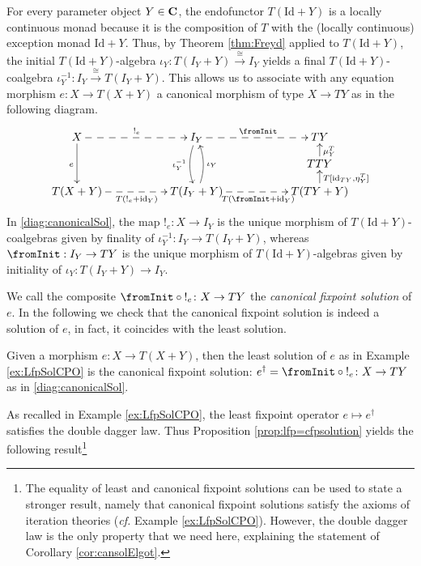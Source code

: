 \documentclass[oribibl,envcountsame,envcountsect,runningheads]{llncs}
\newcommand{\toFinal}[1]{{!_{#1}}}\DeclareMathSymbol{\fromInit}{\mathord}{operators}{"3C}
\renewcommand{\>}{\rangle}
\def\id{\mathrm{id}}
\def\Id{\mathrm{Id}}
\def\lsol#1{{#1}^\dag} \def\gensol#1{{#1}^\dag} \def\ssol#1{{#1}^{\star}} \def\cansol#1{{#1}^\dag}
\def\carrier{I}
\def\:{\colon}
\begin{document}
For every parameter object $Y \in \mathbf{C}$, the endofunctor $T(\Id +Y)$ is
a locally continuous monad because it is the composition of $T$ with the (locally continuous) exception monad $\Id +Y$. Thus, by Theorem \ref{thm:Freyd} applied to $T(\Id +Y)$, the initial $T(\Id +Y)$-algebra $\iota_Y : T(\carrier_Y + Y)\xrightarrow{\cong} \carrier_Y$ yields a final $T(\Id +Y)$-coalgebra $\iota_Y^{-1} : \carrier_Y \xrightarrow{\cong} T(\carrier_Y + Y)$. This allows us to associate with any equation morphism $e: X \to T(X+Y)$ a canonical morphism of type $X \to TY$ as in the following diagram.
\begin{equation}\label{diag:canonicalSol}
\vcenter{
    \xymatrix@R=10pt{
    X \ar@{-->}[rr]^{\toFinal{e}} \ar[dd]_{e} & & \carrier_Y \ar@/_/[dd]_{\iota_Y^{-1}} \ar@{-->}[rr]^{\fromInit} & & TY\\
     & & & & TTY \ar[u]_{\mu^T_Y} \\
    T(X+Y)  \ar@{-->}[rr]_{T(\toFinal{e} + \id_Y)} & & T(\carrier_Y +Y)
    \ar@/_/[uu]_{\iota_Y}
    \ar@{-->}[rr]_{T( \fromInit + \id_Y)} & & T(TY+Y) \ar[u]_{T[\id_{T Y},\eta^T_Y]}
    }
}
\end{equation}
In \eqref{diag:canonicalSol}, the map $\toFinal{e}\: X \to \carrier_Y$ is the unique morphism of  $T(\Id +Y)$-coalgebras given by finality of  $\iota_Y^{-1} \: \carrier_Y \to T(\carrier_Y + Y)$, whereas $\fromInit: \carrier_Y \to TY$ is the unique morphism of $T(\Id +Y)$-algebras given by initiality of $\iota_Y \: T(\carrier_Y + Y)\to \carrier_Y$.

We call the composite $\fromInit \circ \toFinal{e}\: X \to TY$ the \emph{canonical fixpoint solution} of $e$. In the following we check that the canonical fixpoint solution is indeed a solution of $e$, in fact, it coincides with the least solution. 


\newcommand{\proplfpcfpsolution}{Given a morphism $e\: X \to T(X+Y)$, then the least solution of $e$ as in Example \ref{ex:LfpSolCPO} is the canonical fixpoint solution: $\cansol e =\fromInit \circ \toFinal{e}\: X \to TY$ as in \eqref{diag:canonicalSol}.}
\begin{proposition} \label{prop:lfp=cfpsolution}
\proplfpcfpsolution
\end{proposition}


As recalled in Example \ref{ex:LfpSolCPO}, the least fixpoint operator $e \mapsto \lsol e$ satisfies the double dagger law. Thus Proposition \ref{prop:lfp=cfpsolution} yields the following result\footnote{The equality of least and canonical fixpoint solutions can be used to state a stronger result, namely that canonical fixpoint solutions satisfy the axioms of iteration theories (\emph{cf.} Example \ref{ex:LfpSolCPO}). However, the double dagger law is the only property that we need here, explaining the statement of Corollary \ref{cor:cansolElgot}.}
\end{document}
